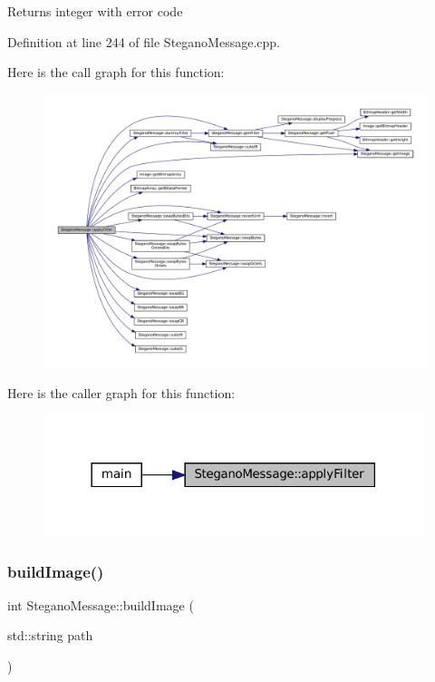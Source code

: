 \begin{DoxyReturn}{Returns}
integer with error code 
\end{DoxyReturn}


Definition at line 244 of file Stegano\+Message.\+cpp.

Here is the call graph for this function\+:\nopagebreak
\begin{figure}[H]
\begin{center}
\leavevmode
\includegraphics[width=350pt]{classSteganoMessage_aec575d6949cf2eb49adefe2f1299d075_cgraph}
\end{center}
\end{figure}
Here is the caller graph for this function\+:\nopagebreak
\begin{figure}[H]
\begin{center}
\leavevmode
\includegraphics[width=314pt]{classSteganoMessage_aec575d6949cf2eb49adefe2f1299d075_icgraph}
\end{center}
\end{figure}
\mbox{\label{classSteganoMessage_ad90a4cf8cf03febfb4c3df955ccab13d}} 
\subsubsection{\texorpdfstring{buildImage()}{buildImage()}}
{\footnotesize\ttfamily int Stegano\+Message\+::build\+Image (\begin{DoxyParamCaption}\item[{std\+::string}]{path }\end{DoxyParamCaption})}



